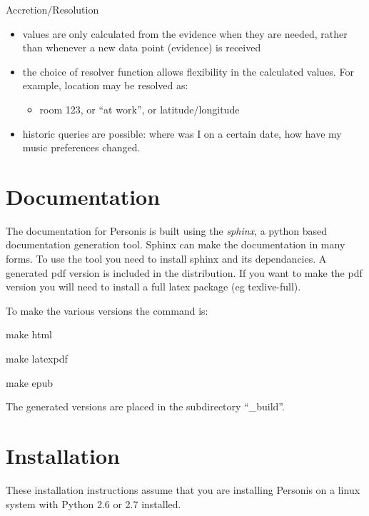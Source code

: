 \documentclass[a4paper,10pt,english]{sphinxmanual}
\begin{document}
Accretion/Resolution
\begin{itemize}
\item {} 
values are only calculated from the evidence when they are needed, rather than whenever a new data point (evidence) is received

\item {} 
the choice of resolver function allows flexibility in the calculated values. For example, location may be resolved as:
\begin{itemize}
\item {} 
room 123, or ``at work'', or latitude/longitude

\end{itemize}

\item {} 
historic queries are possible: where was I on a certain date, how have my music preferences changed.

\end{itemize}


\chapter{Documentation}
\label{Documentation:documentation}\label{Documentation::doc}
The documentation for Personis is built using the \emph{sphinx}, a python based documentation generation tool.
Sphinx can make the documentation in many forms.
To use the tool you need to install sphinx and its dependancies.
A generated pdf version is included in the distribution.
If you want to make the pdf version you will need to install a full latex package (eg texlive-full).

To make the various versions the command is:

\begin{DUlineblock}{0em}
\item[] make html
\item[] make latexpdf
\item[] make epub
\end{DUlineblock}

The generated versions are placed in the subdirectory ``\_build''.


\chapter{Installation}
\label{Installation:installation}\label{Installation::doc}
These installation instructions assume that you are installing Personis on a linux system with Python 2.6 or 2.7
installed.
\end{document}
